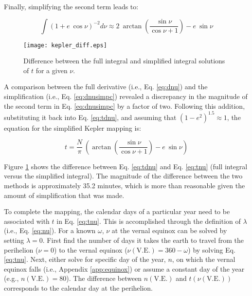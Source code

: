 \noindent Finally, simplifying the second term leads to:

\begin{equation}
\label{eq:dnusimpc}
		\int \left(1+e\:\cos\nu\right)^{-2} d\nu \approx 
			2\:\arctan \left( \frac{\sin\nu}{\cos\nu +1}
			\right) - e\:\sin\nu
\end{equation}

\begin{figure}[ht!]
    \texttt{[image: kepler\_diff.eps]}
    \caption{Difference between the full integral and simplified integral solutions of $t$ for a given $\nu$.}
    \label{fig:dkepler}
\end{figure}

\noindent A comparison between the full derivative (i.e., Eq. \ref{eq:dnu}) and the simplification (i.e., Eq. \ref{eq:dnusimpc}) revealed a discrepancy in the magnitude of the second term in Eq. \ref{eq:dnusimpc} by a factor of two. 
Following this addition, substituting it back into Eq. \ref{eq:tdnu}, and assuming that $(1-e^2)^{1.5} \approx 1$, the equation for the simplified Kepler mapping is:

\begin{equation}
\label{eq:tnu}
	t = \frac{N}{\pi}\:\left( \arctan \left( \frac{\sin\nu}{\cos\nu + 1} \right) - e \:\sin\nu \right)
\end{equation}

Figure \ref{fig:dkepler} shows the difference between Eq. \ref{eq:tdnu} and Eq. \ref{eq:tnu} (full integral versus the simplified integral). 
The magnitude of the difference between the two methods is approximately 35.2 minutes, which is more than reasonable given the amount of simplification that was made.

To complete the mapping, the calendar days of a particular year need to be associated with $t$ in Eq. \ref{eq:tnu}. 
This is accomplished through the definition of $\lambda$ (i.e., Eq. \ref{eq:nu}). 
For a known $\omega$, $\nu$ at the vernal equinox can be solved by setting $\lambda = 0$. 
First find the number of days it takes the earth to travel from the perihelion ($\nu = 0$) to the vernal equinox ($\nu(\text{V.E.}) = 360-\omega$) by solving Eq. \ref{eq:tnu}. 
Next, either solve for specific day of the year, $n$, on which the vernal equinox falls (i.e., Appendix \ref{app:equinox}) or assume a constant day of the year (e.g., $n(\text{V.E.}) = 80$). 
The difference between $n(\text{V.E.})$ and $t(\nu(\text{V.E.}))$ corresponds to the calendar day at the perihelion.

